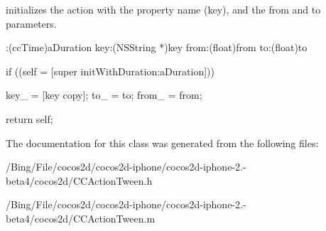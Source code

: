 initializes the action with the property name (key), and the from and to parameters. 
\begin{DoxyCode}
                      :(ccTime)aDuration key:(NSString *)key from:(float)from 
      to:(float)to {

        if ((self = [super initWithDuration:aDuration])) {

                key_    = [key copy];
                to_             = to;
                from_   = from;

        }

        return self;
}
\end{DoxyCode}


The documentation for this class was generated from the following files\-:\begin{DoxyCompactItemize}
\item 
/\-Bing/\-File/cocos2d/cocos2d-\/iphone/cocos2d-\/iphone-\/2.-\/beta4/cocos2d/C\-C\-Action\-Tween.\-h\item 
/\-Bing/\-File/cocos2d/cocos2d-\/iphone/cocos2d-\/iphone-\/2.-\/beta4/cocos2d/C\-C\-Action\-Tween.\-m\end{DoxyCompactItemize}
